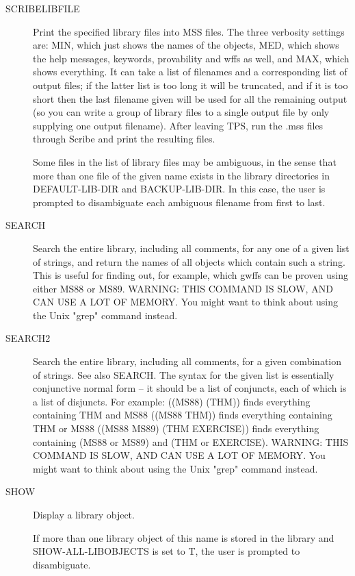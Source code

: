 \begin{description}
\item[SCRIBELIBFILE]  
Print the specified library files into MSS files.
The three verbosity settings are: MIN, which just shows the names of the 
objects, MED, which shows the help messages, keywords, provability and wffs 
as well, and MAX, which shows everything. It can take a list of filenames and 
a corresponding list of output files; if the latter list is too long it will 
be truncated, and if it is too short then the last filename given will be used 
for all the remaining output (so you can write a group of library files to a 
single output file by only supplying one output filename).  
After leaving TPS, run the .mss files through Scribe and print the resulting
files.

Some files in the list of library files may be ambiguous, in the 
sense that more than one file of the given name exists in the 
library directories in DEFAULT-LIB-DIR and BACKUP-LIB-DIR.  
In this case, the user is prompted to disambiguate each ambiguous
filename from first to last.

\item[SEARCH]  
Search the entire library, including all comments, for any one
of a given list of strings, and return the names of all objects which
contain such a string. This is useful for finding out, for example,
which gwffs can be proven using either MS88 or MS89.
WARNING: THIS COMMAND IS SLOW, AND CAN USE A LOT OF MEMORY.
You might want to think about using the Unix "grep" command instead.

\item[SEARCH2]  
Search the entire library, including all comments, for a 
given combination of strings. See also SEARCH.
The syntax for the given list is essentially conjunctive normal
form -- it should be a list of conjuncts, each of which is a list of 
disjuncts.
For example:
((MS88) (THM)) finds everything containing THM and MS88
((MS88 THM)) finds everything containing THM or MS88
((MS88 MS89) (THM EXERCISE)) finds everything containing (MS88 or MS89)
                             and (THM or EXERCISE).
WARNING: THIS COMMAND IS SLOW, AND CAN USE A LOT OF MEMORY.
You might want to think about using the Unix "grep" command instead.

\item[SHOW]  
Display a library object.

If more than one library object of this name is stored in
the library and SHOW-ALL-LIBOBJECTS is set to T,
the user is prompted to disambiguate.


\end{description}
